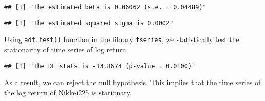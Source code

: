 \documentclass[
  12pt,
]{article}
\newenvironment{Shaded}{\begin{snugshade}}{\end{snugshade}}
\newcommand{\DataTypeTok}[1]{\textcolor[rgb]{0.13,0.29,0.53}{#1}}
\newcommand{\DecValTok}[1]{\textcolor[rgb]{0.00,0.00,0.81}{#1}}
\newcommand{\KeywordTok}[1]{\textcolor[rgb]{0.13,0.29,0.53}{\textbf{#1}}}
\newcommand{\NormalTok}[1]{#1}
\newcommand{\OperatorTok}[1]{\textcolor[rgb]{0.81,0.36,0.00}{\textbf{#1}}}
\newcommand{\OtherTok}[1]{\textcolor[rgb]{0.56,0.35,0.01}{#1}}
\newcommand{\StringTok}[1]{\textcolor[rgb]{0.31,0.60,0.02}{#1}}
\begin{document}
\begin{Shaded}
\end{Shaded}

\begin{Shaded}
\end{Shaded}

\begin{verbatim}
## [1] "The estimated beta is 0.06062 (s.e. = 0.04489)"
\end{verbatim}

\begin{Shaded}
\end{Shaded}

\begin{verbatim}
## [1] "The estimated squared sigma is 0.0002"
\end{verbatim}

Using \texttt{adf.test()} function in the library \texttt{tseries}, we
statistically test the stationarity of time series of log return.

\begin{Shaded}
\end{Shaded}

\begin{verbatim}
## [1] "The DF stats is -13.8674 (p-value = 0.0100)"
\end{verbatim}

As a result, we can reject the null hypothesis. This implies that the
time series of the log return of Nikkei225 is stationary.
\end{document}
